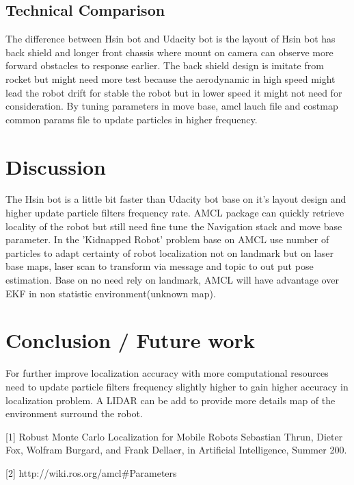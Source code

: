 \documentclass[10pt,journal,compsoc]{IEEEtran}
\begin{document}
\subsection{Technical Comparison} %
The difference between Hsin bot and Udacity bot is the layout of Hsin bot has back shield and longer front chassis where mount on camera can observe more forward obstacles to response earlier. The back shield design is imitate from rocket but might need more test because the aerodynamic in high speed might lead the robot drift for stable the robot but in lower speed it might not need for consideration. By tuning parameters in move base, amcl lauch file and costmap common params file to update particles in higher frequency.

\section{Discussion}
The Hsin bot is a little bit faster than Udacity bot base on it's layout design and higher update particle filters frequency rate. AMCL package can quickly retrieve locality of the robot but still need fine tune the Navigation stack and move base parameter. In the 'Kidnapped Robot' problem base on AMCL use number of particles to adapt certainty of robot localization not on landmark but on laser base maps, laser scan to transform via message and topic to out put pose estimation. Base on no need rely on landmark, AMCL will have advantage over EKF in non statistic environment(unknown map).
 
\section{Conclusion / Future work}
For further improve localization accuracy with more computational resources need to update particle filters frequency slightly higher to gain higher accuracy in localization problem. A LIDAR can be add to provide more details map of the environment surround the robot. 




[1] Robust Monte Carlo Localization for Mobile Robots Sebastian Thrun, Dieter Fox, Wolfram Burgard, and Frank Dellaer, in Artificial Intelligence, Summer 200.

[2] http://wiki.ros.org/amcl#Parameters
\end{document}
